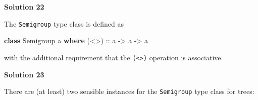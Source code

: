 \documentclass[11pt,
  american,
  DIV13]{article}
\newenvironment{Shaded}{}{}
\newcommand{\DataTypeTok}[1]{\textcolor[rgb]{0.56,0.13,0.00}{#1}}
\newcommand{\KeywordTok}[1]{\textcolor[rgb]{0.00,0.44,0.13}{\textbf{#1}}}
\newcommand{\NormalTok}[1]{#1}
\newcommand{\OtherTok}[1]{\textcolor[rgb]{0.00,0.44,0.13}{#1}}
\begin{document}
\textbf{Solution 22}

The \texttt{Semigroup} type class is defined as

\begin{Shaded}
\begin{Highlighting}[]
\KeywordTok{class} \DataTypeTok{Semigroup}\NormalTok{ a }\KeywordTok{where}
\OtherTok{  (\textless{}\textgreater{}) ::}\NormalTok{ a }\OtherTok{{-}\textgreater{}}\NormalTok{ a }\OtherTok{{-}\textgreater{}}\NormalTok{ a}
\end{Highlighting}
\end{Shaded}

with the additional requirement that the
\texttt{(\textless{}\textgreater{})} operation is associative.

\textbf{Solution 23}

There are (at least) two sensible instances for the \texttt{Semigroup}
type class for trees:
\end{document}
